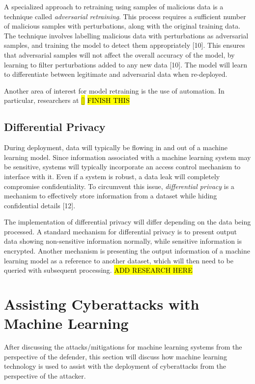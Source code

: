 \documentclass[11pt,conference]{IEEEtran}
\begin{document}
A specialized approach to retraining using samples of malicious data is a technique called
\emph{adversarial retraining}. This process requires  
a sufficient number of malicious samples with perturbations, along with the
original training data. The technique
involves labelling malicious data with perturbations as adversarial samples, and training
the model to detect them appropriately [10]. This ensures that adversarial samples will not affect
the overall accuracy of the model, by learning to filter perturbations added to
any new data [10]. The model will learn to differentiate between legitimate and
adversarial data when re-deployed.

Another area of interest for model retraining is the use of automation. In
particular, researchers at \hl{[]} \hl{FINISH THIS}

\subsection{Differential Privacy}
During deployment, data will typically be flowing in and out of a machine
learning model. Since information associated with a machine learning system may be
sensitive, systems will typically incorporate an access control mechanism to interface with it. Even if a system
is robust, a data leak will completely compromise confidentiality. To
circumvent this issue, \emph{differential privacy} is a mechanism to
effectively store
information from a dataset while hiding confidential details [12].

The implementation of differential privacy will differ depending on the data
being processed. A standard mechanism for differential privacy is to present
output data showing non-sensitive information normally, while sensitive
information is encrypted. Another mechanism is presenting the output
information of a machine learning model as a reference to another dataset, which
will then need to be queried with subsequent processing.
\hl{ADD RESEARCH HERE}

\section{Assisting Cyberattacks with Machine Learning}
After discussing the attacks/mitigations for machine learning systems
from the perspective of the defender, this section will discuss how machine
learning technology is used to assist with the deployment of cyberattacks from
the perspective of the attacker.
\end{document}
